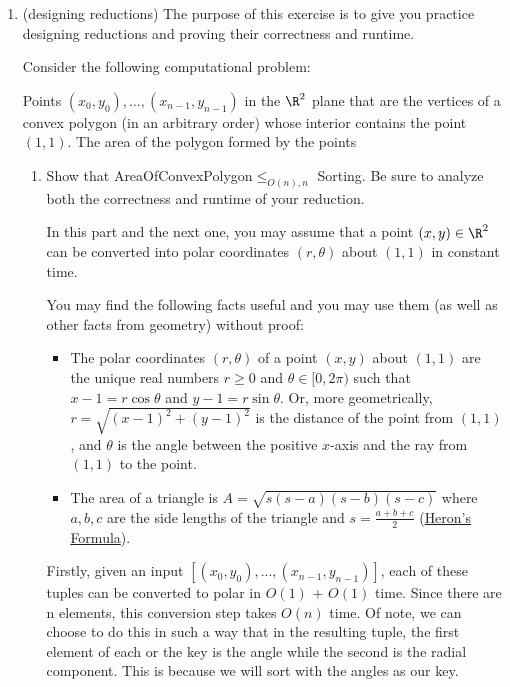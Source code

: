 \documentclass[11pt]{report}
\begin{document}
\begin{enumerate}
     \item  (designing reductions)
     The purpose of this exercise is to give you practice designing reductions and proving their correctness and runtime.

    Consider the following computational problem:

    {Points $(x_0,y_0),\ldots,(x_{n-1},y_{n-1})$ in the $\R^2$ plane that are the vertices of a convex polygon (in an arbitrary order) whose interior contains the point $(1,1)$.}
    {The area of the polygon formed by the points}

    \begin{enumerate}
        \item \label{part:polar} 
        Show that AreaOfConvexPolygon$\leq_{O(n),n}$ Sorting.  Be sure to analyze both the correctness and runtime of your reduction.

        In this part and the next one, you may assume that a point $(x,y)\in \R^2$ can be converted into polar coordinates $(r,\theta)$ about $(1,1)$ in constant time. 

        You may find the following facts useful and you may use them (as well as other facts from geometry) without proof:
        \begin{itemize}
            \item The polar coordinates $(r,\theta)$ of a point $(x,y)$ about $(1,1)$ are the unique real numbers $r\geq 0$ and $\theta\in [0,2\pi)$ such that $x-1=r\cos \theta$ and $y-1=r\sin \theta$. Or, more geometrically, $r=\sqrt{(x-1)^2+(y-1)^2}$ is the distance of the point from $(1,1)$, and $\theta$ is the angle between the positive $x$-axis and the ray from $(1,1)$ to the point.
            \item The area of a triangle is $A = \sqrt{s(s-a)(s-b)(s-c)}$ where $a, b, c$ are the side lengths of the triangle and $s = \frac{a + b + c}{2}$ (\href{https://en.wikipedia.org/wiki/Heron\%27s_formula}{Heron's Formula}).
        \end{itemize}

        Firstly, given an input $[(x_0,y_0),...,(x_{n-1},y_{n-1})]$, each of these tuples can be converted to polar in $O(1)$ + $O(1)$ time.
        Since there are n elements, this conversion step takes $O(n)$ time.
        Of note, we can choose to do this in such a way that in the resulting tuple, the first element of each or the key is the angle while the second is the radial component.
        This is because we will sort with the angles as our key. 


\end{enumerate}
\end{enumerate}
\end{document}
